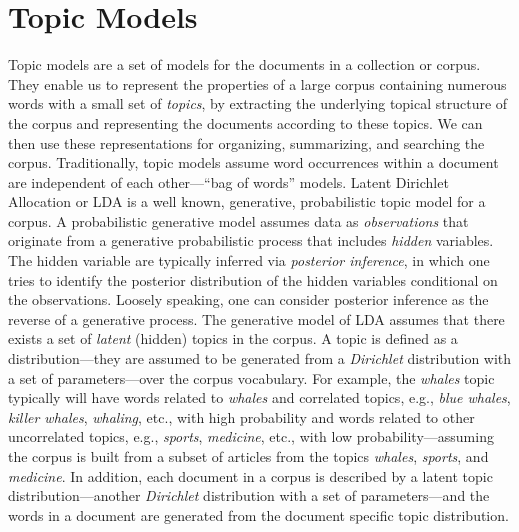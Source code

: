 \section{Topic Models}


Topic models are a set of models for the documents in a collection 
or corpus. They enable us to represent the properties of a large 
corpus containing numerous words with a small set of \textsl{topics}, 
by extracting the underlying topical structure of the corpus and 
representing the documents according to these topics. We can then 
use these representations for organizing, summarizing, and searching 
the corpus. Traditionally, topic models assume word occurrences 
within a document are independent of each other---``bag of words'' 
models. Latent Dirichlet Allocation or LDA 
\cite{Blei2003} is a well known, generative, probabilistic   
topic model for a corpus. A probabilistic generative model assumes 
data as \textsl{observations} that originate from a generative 
probabilistic process that includes \textsl{hidden} variables. The 
hidden variable are typically inferred via \textsl{posterior 
inference}, in which one tries to identify the posterior 
distribution of the hidden variables conditional on the observations. 
Loosely speaking, one can consider posterior inference as the 
reverse of a generative process. The generative model of LDA assumes 
that there exists a set of \textsl{latent} (hidden) topics in the 
corpus. A topic is defined as a distribution---they are assumed to 
be generated from a \textsl{Dirichlet} distribution with a set of 
parameters---over the corpus vocabulary. For example, the 
\textit{whales} topic typically will have words related to 
\textit{whales}  and correlated topics, e.g., 
\textit{blue whales}, \textit{killer whales}, \textit{whaling}, 
etc., with high probability and words related to other uncorrelated 
topics, e.g., \textit{sports}, \textit{medicine}, etc., with low 
probability---assuming the corpus is built from a subset of articles 
from the topics \textit{whales}, \textit{sports}, and 
\textit{medicine}. In addition, each document in a corpus is 
described by a latent topic distribution---another 
\textsl{Dirichlet} distribution with a set of parameters---and the 
words in a document are generated from the document specific topic 
distribution. 


